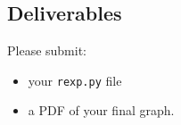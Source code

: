 \begin{fullwidth}
\section{Deliverables}

Please submit:

\begin{itemize}
\item your {\tt rexp.py} file
\item a PDF of your final graph.
\end{itemize}

\end{fullwidth}
